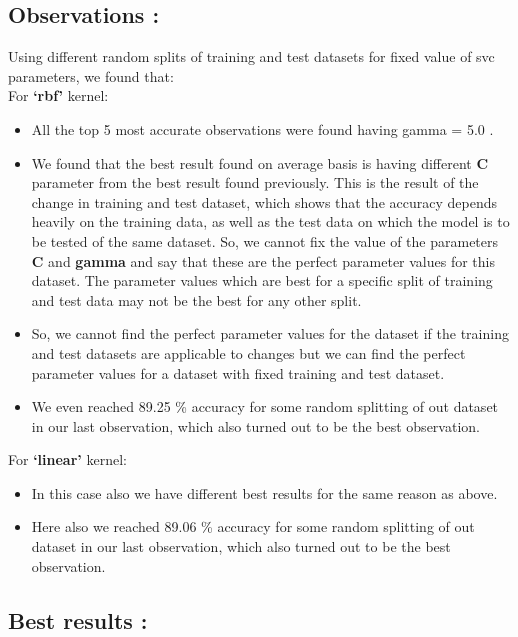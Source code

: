\documentclass{report}
\begin{document}
\subsection{\LARGE Observations :}
Using different random splits of training and test datasets for fixed value of svc parameters, we found that:\\
\linebreak
\linebreak
For \textbf{‘rbf’} kernel:
\begin{itemize}
\item All the top 5 most accurate observations were found having gamma = 5.0 .
\item We found that the best result found on average basis is having different \textbf{C} parameter from the best result found previously. This is the result of the change in training and test dataset, which shows that the accuracy depends heavily on the training data, as well as the test data on which the model is to be tested of the same dataset. So, we cannot fix the value of the parameters \textbf{C} and \textbf{gamma} 
and say that these are the perfect parameter values for this dataset. The parameter values which are best for a specific split of training and test data may not be the best for any other split.
\item So, we cannot find the perfect parameter values for the dataset if the training and test datasets are applicable to  changes but we can find the perfect parameter values for a dataset with fixed training and test dataset.
\item We even reached 89.25 \% accuracy for some random splitting of out dataset in our last observation, which also turned out to be the best observation.
\end{itemize}
For \textbf{‘linear’} kernel:
\begin{itemize}
\item In this case also we have different best results for the same reason as above.
\item Here also we reached 89.06 \% accuracy for some random splitting of out dataset in our last observation, which also turned out to be the best observation.
\end{itemize}
\subsection{\LARGE Best results :}
\end{document}
